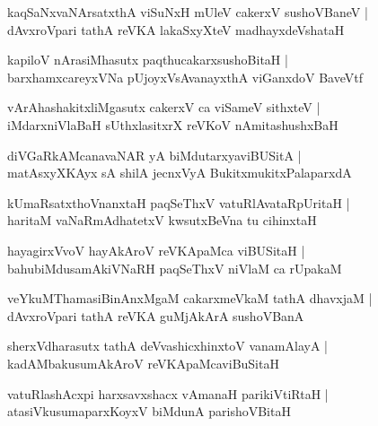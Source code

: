 \documentclass[twoside,12pt,openright]{book}
\newcounter{shloka}[chapter]
\begin{document}
\begin{shloka}%
kaqSaNxvaNArsatxthA viSuNxH mUleV cakerxV sushoVBaneV |\\
dAvxroVpari tathA reVKA lakaSxyXteV madhayxdeVshataH 
\end{shloka}

\begin{shloka}%
kapiloV nArasiMhasutx paqthucakarxsushoBitaH |\\
barxhamxcareyxVNa pUjoyxVsAvanayxthA viGanxdoV BaveVtf
\end{shloka}

\begin{shloka}%
vArAhashakitxliMgasutx cakerxV ca viSameV sithxteV |\\
iMdarxniVlaBaH sUthxlasitxrX reVKoV nAmitashushxBaH 
\end{shloka}

\begin{shloka}%
diVGaRkAMcanavaNAR yA biMdutarxyaviBUSitA |\\
matAsxyXKAyx sA shilA jecnxVyA BukitxmukitxPalaparxdA 
\end{shloka}

\begin{shloka}%
kUmaRsatxthoVnanxtaH paqSeThxV vatuRlAvataRpUritaH |\\
haritaM vaNaRmAdhatetxV kwsutxBeVna tu cihinxtaH 
\end{shloka}

\begin{shloka}%
hayagirxVvoV hayAkAroV reVKApaMca viBUSitaH |\\
bahubiMdusamAkiVNaRH paqSeThxV niVlaM ca rUpakaM 
\end{shloka}

\begin{shloka}%
veYkuMThamasiBinAnxMgaM cakarxmeVkaM tathA dhavxjaM |\\
dAvxroVpari tathA reVKA guMjAkArA sushoVBanA
\end{shloka}

\begin{shloka}%
sherxVdharasutx tathA deVvashicxhinxtoV vanamAlayA |\\
kadAMbakusumAkAroV reVKApaMcaviBuSitaH 
\end{shloka}

\begin{shloka}%
vatuRlashAcxpi harxsavxshacx vAmanaH parikiVtiRtaH |\\
atasiVkusumaparxKoyxV biMdunA parishoVBitaH 
\end{shloka}
\end{document}
